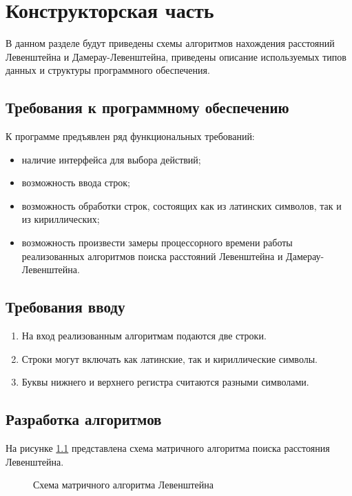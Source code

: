 \chapter{Конструкторская часть}

В данном разделе будут приведены схемы алгоритмов нахождения расстояний Левенштейна и Дамерау-Левенштейна, приведены описание используемых типов данных и структуры программного обеспечения.

\section{Требования к программному обеспе\-чению}

К программе предъявлен ряд функциональных требований:

\begin{itemize}
    \item наличие интерфейса для выбора действий;
    \item возможность ввода строк;
    \item возможность обработки строк, состоящих как из латинских символов, так и из кириллических;
    \item возможность произвести замеры процессорного времени работы ре\-ализованных алгоритмов поиска расстояний Левенштейна и Дамерау-Левенштейна.
\end{itemize}

\section{Требования вводу}

\begin{enumerate}
    \item На вход реализованным алгоритмам подаются две строки.
    \item Строки могут включать как латинские, так и кириллические сим\-волы.
    \item Буквы нижнего и верхнего регистра считаются разными символами.
\end{enumerate}

\section{Разработка алгоритмов}

На рисунке \ref{fig:lev-iter} представлена схема матричного алгоритма поиска расстояния Левенштейна.

\begin{figure}[p]
    \centering
    
    \caption{Схема матричного алгоритма Левенштейна}
    \label{fig:lev-iter}
\end{figure}

